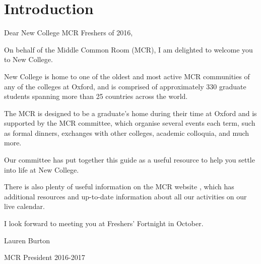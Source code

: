 
\chapter{Introduction}

Dear New College MCR Freshers of 2016,

\medskip

\noindent On behalf of the Middle Common Room (MCR), I am delighted to welcome you to New College. 

\medskip

\noindent New College is home to one of the oldest and most active MCR communities of any of the colleges at Oxford, and is comprised of approximately 330 graduate students spanning more than 25 countries across the world. 

\medskip
\noindent The MCR is designed to be a graduate’s home during their time at Oxford and is supported by the MCR committee, which organise several events each term, such as formal dinners, exchanges with other colleges, academic colloquia, and much more.
\medskip

\noindent Our committee has put together this guide as a useful resource to help you settle into life at New College. 

\medskip

\noindent There is also plenty of useful information on the MCR website \href{http://mcr.new.ox.ac.uk/?n=Main.HomePage}{}, which has
additional resources and up-to-date information about all our activities on our live calendar.

\medskip

\noindent I look forward to meeting you at Freshers' Fortnight in October.


\bigskip

\noindent Lauren Burton

\noindent \footnotesize{MCR President 2016-2017

\noindent
\href{mailto:Arnold.Mathijssen@new.ox.ac.uk}{}}
